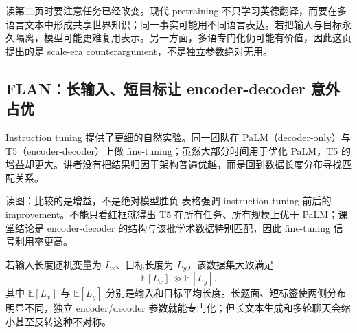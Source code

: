 
读第二页时要注意任务已经改变。现代 pretraining 不只学习英德翻译，而要在多语言文本中形成共享世界知识；同一事实可能用不同语言表达。若把输入与目标永久隔离，模型可能更难复用表示。另一方面，多语专门化仍可能有价值，因此这页提出的是 scale-era counterargument，不是独立参数绝对无用。


\subsection{FLAN：长输入、短目标让 encoder-decoder 意外占优}

Instruction tuning 提供了更细的自然实验。同一团队在 PaLM（decoder-only）与 T5（encoder-decoder）上做 fine-tuning；虽然大部分时间用于优化 PaLM，T5 的增益却更大。讲者没有把结果归因于架构普遍优越，而是回到数据长度分布寻找匹配关系。



\begin{knowledgebox}{读图：比较的是增益，不是绝对模型胜负}
表格强调 instruction tuning 前后的 improvement。不能只看红框就得出 T5 在所有任务、所有规模上优于 PaLM；课堂结论是 encoder-decoder 的结构与该批学术数据特别匹配，因此 fine-tuning 信号利用率更高。
\end{knowledgebox}


若输入长度随机变量为 $L_x$、目标长度为 $L_y$，该数据集大致满足
\[
\mathbb{E}[L_x]\gg \mathbb{E}[L_y].
\]
其中 $\mathbb{E}[L_x]$ 与 $\mathbb{E}[L_y]$ 分别是输入和目标平均长度。长题面、短标签使两侧分布明显不同，独立 encoder/decoder 参数就能专门化；但长文本生成和多轮聊天会缩小甚至反转这种不对称。


